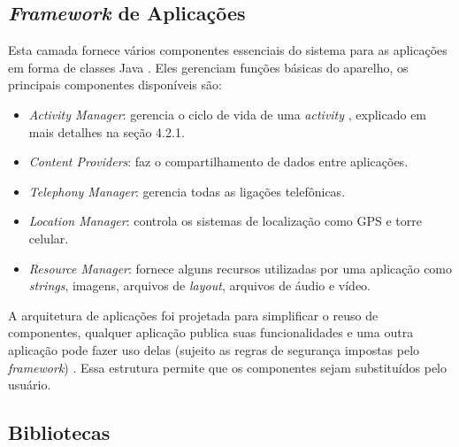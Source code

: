 \subsection{\textit{Framework} de Aplicações}
  Esta camada fornece vários componentes essenciais do sistema para as aplicações em forma de classes Java \cite{android1}. 
  Eles gerenciam funções básicas do aparelho, os principais componentes disponíveis são:
  \begin{itemize}
   \item \textit{Activity Manager}: gerencia o ciclo de vida de uma \textit{activity} \cite{activity}, explicado em 
   mais detalhes na seção 4.2.1.
   \item \textit{Content Providers}: faz o compartilhamento de dados entre aplicações.
   \item \textit{Telephony Manager}: gerencia todas as ligações telefônicas.
   \item \textit{Location Manager}: controla os sistemas de localização como GPS e torre celular.
   \item \textit{Resource Manager}: fornece alguns recursos utilizadas por uma aplicação como \textit{strings}, imagens, arquivos de \textit{layout}, 
   arquivos de áudio e vídeo.
  \end{itemize}

   A arquitetura de aplicações foi projetada para simplificar o reuso de componentes, qualquer aplicação publica suas funcionalidades e uma
    outra aplicação pode fazer uso delas (sujeito as regras de segurança impostas pelo \textit{framework}) \cite{android0}. Essa estrutura permite que os componentes 
    sejam substituídos pelo usuário.
    
\subsection{Bibliotecas}

